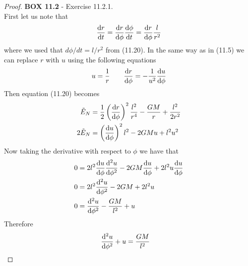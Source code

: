 \documentclass[11pt]{article}
\theoremstyle{definition}
\begin{document}
\begin{proof}{\textbf{BOX 11.2} - Exercise 11.2.1.}\\
    First let us note that
    \begin{align*}
        \dv{r}{t} = \dv{r}{\phi}\dv{\phi}{t} = \dv{r}{\phi}\frac{l}{r^2}
    \end{align*}
    where we used that $d\phi/dt = l/r^2$ from (11.20). In the same way as in
    (11.5) we can replace $r$ with $u$ using the following equations 
    \begin{align*}
        u = \frac{1}{r} \qquad \dv{r}{\phi} = -\frac{1}{u^2}\dv{u}{\phi}
    \end{align*}
    Then equation (11.20) becomes
    \begin{align*}
        \tilde{E}_N &= \frac{1}{2}\left(\dv{r}{\phi}\right)^2\frac{l^2}{r^4}
        - \frac{GM}{r} + \frac{l^2}{2r^2}\\
        2\tilde{E}_N &= \left(\dv{u}{\phi}\right)^2l^2 - 2GMu + l^2u^2
    \end{align*}
    Now taking the derivative with respect to $\phi$ we have that
    \begin{align*}
        0 &= 2l^2\dv{u}{\phi}\dv[2]{u}{\phi}
        - 2GM\dv{u}{\phi} + 2l^2u\dv{u}{\phi}\\
        0 &= 2l^2\dv[2]{u}{\phi} - 2GM + 2l^2u\\
        0 &= \dv[2]{u}{\phi} - \frac{GM}{l^2} + u
    \end{align*}
    Therefore
    \begin{align*}
        \dv[2]{u}{\phi} + u &= \frac{GM}{l^2}
    \end{align*}
\end{proof}
\cleardoublepage
\end{document}
